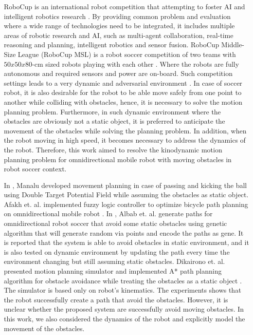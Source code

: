 \documentclass[conference]{IEEEtran}
\begin{document}
RoboCup is an international robot competition that attempting to foster AI and intelligent robotics research \cite{kitano1997robocup}. By providing common problem and evaluation where a wide range of technologies need to be integrated, it includes multiple areas of robotic research and AI, such as multi-agent collaboration, real-time reasoning and planning, intelligent robotics and sensor fusion. RoboCup Middle-Size League (RoboCup MSL) is a robot soccer competition of two teams with $50 x 50 x 80$-cm sized robots playing with each other \cite{burkhard2002road}. Where the robots are fully autonomous and required sensors and power are on-board. Such competition settings leads to a very dynamic and adversarial environment \cite{burkhard2002road}. In case of soccer robot, it is also desirable for the robot to be able move safely from one point to another while colliding with obstacles, hence, it is necessary to solve the motion planning problem. Furthermore, in such dynamic environment where the obstacles are obviously not a static object, it is preferred to anticipate the movement of the obstacles while solving the planning problem. In addition, when the robot moving in high speed, it becomes necessary to address the dynamics of the robot. Therefore, this work aimed to resolve the kinodynamic motion planning problem for omnidirectional mobile robot with moving obstacles in robot soccer context.

In \cite{manalu2014double}, Manalu developed movement planning in case of passing and kicking the ball using Double Target Potential Field while assuming the obstacles as static object. Afakh et. al. implemented fuzzy logic controller to  optimize bicycle path planning on omnidirectional mobile robot \cite{afakh2018bicycle}. In \cite{albab2017path}, Albab et. al. generate paths for omnidirectional robot soccer that avoid some static obstacles using genetic algorithm that will generate random via points and encode the paths as gene. It is reported that the system is able to avoid obstacles in static environment, and it is also tested on dynamic environment by updating the path every time the environment changing but still assuming static obstacles. Dikairono et. al. presented motion planning simulator and implemented A* path planning algorithm for obstacle avoidance while treating the obstacles as a static object \cite{dikairono2017motion}. The simulator is based only on robot's kinematics. The experiments shows that the robot successfully create a path that avoid the obstacles. However, it is unclear whether the proposed system are successfully avoid moving obstacles. In this work, we also considered the dynamics of the robot and explicitly model the movement of the obstacles.
\end{document}
